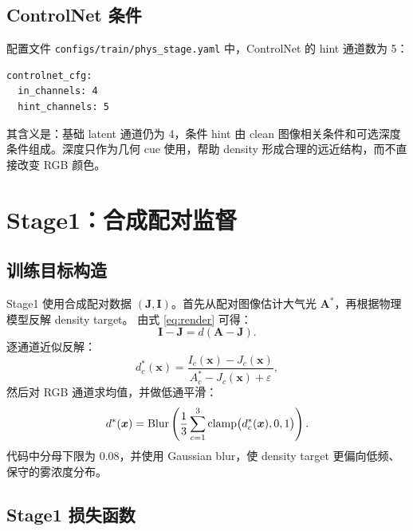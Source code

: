 \documentclass[11pt,a4paper]{ctexart}
\begin{document}
\subsection{ControlNet 条件}

配置文件 \texttt{configs/train/phys\_stage.yaml} 中，ControlNet 的 hint 通道数为 5：
\begin{lstlisting}
controlnet_cfg:
  in_channels: 4
  hint_channels: 5
\end{lstlisting}
其含义是：基础 latent 通道仍为 4，条件 hint 由 clean 图像相关条件和可选深度条件组成。深度只作为几何 cue 使用，帮助 density 形成合理的远近结构，而不直接改变 RGB 颜色。

\section{Stage1：合成配对监督}

\subsection{训练目标构造}

Stage1 使用合成配对数据 $(\bm{J},\bm{I})$。首先从配对图像估计大气光 $\bm{A}^{*}$，再根据物理模型反解 density target。
由式 \eqref{eq:render} 可得：
\begin{equation}
  \bm{I} - \bm{J}
  =
  d(\bm{A}-\bm{J}).
\end{equation}
逐通道近似反解：
\begin{equation}
  d_c^{*}(\bm{x})
  =
  \frac{I_c(\bm{x})-J_c(\bm{x})}
       {A_c^{*}-J_c(\bm{x})+\varepsilon},
  \label{eq:density_channel}
\end{equation}
然后对 RGB 通道求均值，并做低通平滑：
\begin{equation}
  d^{*}(\bm{x})
  =
  {\rm Blur}\left(
  \frac{1}{3}\sum_{c=1}^{3}
  {\rm clamp}\bigl(d_c^{*}(\bm{x}),0,1\bigr)
  \right).
  \label{eq:density_target}
\end{equation}
代码中分母下限为 0.08，并使用 Gaussian blur，使 density target 更偏向低频、保守的雾浓度分布。

\subsection{Stage1 损失函数}
\end{document}

